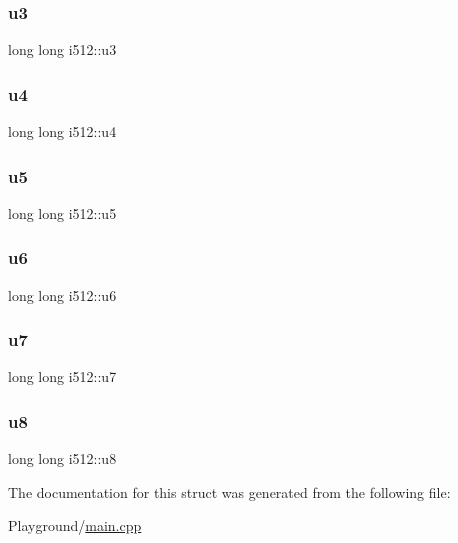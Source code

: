 \mbox{\label{structi512_a7b2ebbb360de90c668e274edd520692f}} 
\subsubsection{\texorpdfstring{u3}{u3}}
{\footnotesize\ttfamily long long i512\+::u3}

\mbox{\label{structi512_aa5e15e0dd53281ce868369aba3d581a0}} 
\subsubsection{\texorpdfstring{u4}{u4}}
{\footnotesize\ttfamily long long i512\+::u4}

\mbox{\label{structi512_a47d6f0745ab48fc750cd71ff7f4873a2}} 
\subsubsection{\texorpdfstring{u5}{u5}}
{\footnotesize\ttfamily long long i512\+::u5}

\mbox{\label{structi512_a5336030da073415dcec8917195b3df81}} 
\subsubsection{\texorpdfstring{u6}{u6}}
{\footnotesize\ttfamily long long i512\+::u6}

\mbox{\label{structi512_a0cbf737ca442e08cabd22c1a475213b9}} 
\subsubsection{\texorpdfstring{u7}{u7}}
{\footnotesize\ttfamily long long i512\+::u7}

\mbox{\label{structi512_a4cb0de0ed4509aa1789db1a5568580f6}} 
\subsubsection{\texorpdfstring{u8}{u8}}
{\footnotesize\ttfamily long long i512\+::u8}



The documentation for this struct was generated from the following file\+:\begin{DoxyCompactItemize}
\item 
Playground/\mbox{\hyperlink{_playground_2main_8cpp}{main.\+cpp}}\end{DoxyCompactItemize}
